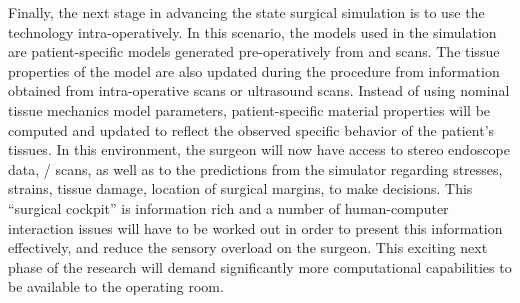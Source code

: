 Finally, the next stage in advancing the state surgical simulation is to use the technology intra-operatively. In this scenario, the models used in the simulation are patient-specific models generated pre-operatively from  and  scans. The tissue properties of the model are also updated during the procedure from information obtained from intra-operative  scans or ultrasound scans. Instead of using nominal tissue mechanics model parameters, patient-specific material properties will be computed and updated to reflect the observed specific behavior of the patient’s tissues. In this environment, the surgeon will now have access to stereo endoscope data, / scans, as well as to the predictions from the simulator regarding stresses, strains, tissue damage, location of surgical margins, \etc to make decisions. This \enquote{surgical cockpit} is information rich and a number of human-computer interaction issues will have to be worked out in order to present this information effectively, and reduce the sensory overload on the surgeon. This exciting next phase of the research will demand significantly more computational capabilities to be available to the operating room.
